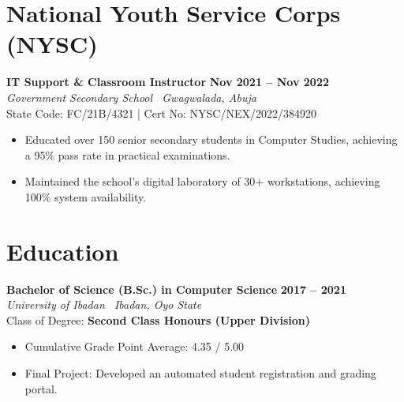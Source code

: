 \documentclass[10pt,a4paper]{article}
\begin{document}
\begin{minipage}[t]{0.65\textwidth}
    \section*{National Youth Service Corps (NYSC)}
    \textbf{IT Support \& Classroom Instructor} \hfill \textbf{Nov 2021 -- Nov 2022} \\
    \textit{Government Secondary School \textperiodcentered\ Gwagwalada, Abuja} \\
    {\small State Code: FC/21B/4321 \quad | \quad Cert No: NYSC/NEX/2022/384920}
    \begin{itemize}[leftmargin=*,noitemsep,topsep=2pt]
        \item Educated over 150 senior secondary students in Computer Studies, achieving a 95\% pass rate in practical examinations.
        \item Maintained the school's digital laboratory of 30+ workstations, achieving 100\% system availability.
    \end{itemize}

    \section*{Education}
    \textbf{Bachelor of Science (B.Sc.) in Computer Science} \hfill \textbf{2017 -- 2021} \\
    \textit{University of Ibadan \textperiodcentered\ Ibadan, Oyo State} \\
    Class of Degree: \textbf{Second Class Honours (Upper Division)}
    \begin{itemize}[leftmargin=*,noitemsep,topsep=2pt]
        \item Cumulative Grade Point Average: 4.35 / 5.00
        \item Final Project: Developed an automated student registration and grading portal.
    \end{itemize}
\end{minipage}
\end{document}
